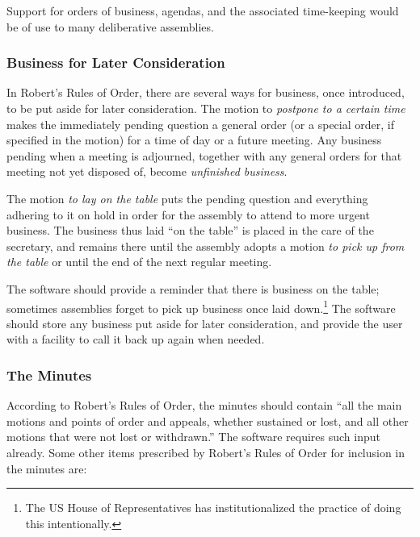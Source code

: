 \documentclass{acm_proc_article-sp}
\begin{document}
Support for orders of business, agendas, and the associated time-keeping would be of use to many deliberative assemblies.

\subsubsection*{Business for Later Consideration}


In Robert's Rules of Order, there are several ways for business, once introduced, to be put aside for later consideration. The motion to \emph{postpone to a certain time} makes the immediately pending question a general order (or a special order, if specified in the motion) for a time of day or a future meeting. Any business pending when a meeting is adjourned, together with any general orders for that meeting not yet disposed of, become \emph{unfinished business}.

The motion \emph{to lay on the table} puts the pending question and everything adhering to it on hold in order for the assembly to attend to more urgent business. The business thus laid ``on the table'' is placed in the care of the secretary, and remains there until the assembly adopts a motion \emph{to pick up from the table} or until the end of the next regular meeting.

The software should provide a reminder that there is business on the table; sometimes assemblies forget to pick up business once laid down.\footnote{The US House of Representatives has institutionalized the practice of doing this intentionally.} The software should store any business put aside for later consideration, and provide the user with a facility to call it back up again when needed.

\subsubsection*{The Minutes}


According to Robert's Rules of Order, the minutes should contain ``all the main motions and points of order and appeals, whether sustained or lost, and all other motions that were not lost or withdrawn.'' The software requires such input already. Some other items prescribed by Robert's Rules of Order for inclusion in the minutes are:
\end{document}
